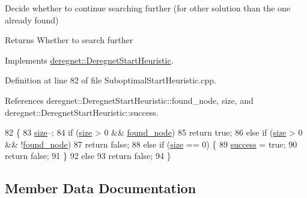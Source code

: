 Decide whether to continue searching further (for other solution than the one already found) 

\begin{DoxyReturn}{Returns}
Whether to search further 
\end{DoxyReturn}


Implements \hyperlink{classderegnet_1_1DeregnetStartHeuristic_ac3ee2c3022512f9d4ec7a6b49358e60a}{deregnet\+::\+Deregnet\+Start\+Heuristic}.



Definition at line 82 of file Suboptimal\+Start\+Heuristic.\+cpp.



References deregnet\+::\+Deregnet\+Start\+Heuristic\+::found\+\_\+node, size, and deregnet\+::\+Deregnet\+Start\+Heuristic\+::success.


\begin{DoxyCode}
82                                               \{
83     \hyperlink{classderegnet_1_1SuboptimalStartHeuristic_a8645bf64e5cd06e7c432eb7b38f3d80a}{size}--;
84     \textcolor{keywordflow}{if} (\hyperlink{classderegnet_1_1SuboptimalStartHeuristic_a8645bf64e5cd06e7c432eb7b38f3d80a}{size} > 0 && \hyperlink{classderegnet_1_1DeregnetStartHeuristic_a1ca705794583fb3b6e563efeceb4445e}{found\_node})
85         \textcolor{keywordflow}{return} \textcolor{keyword}{true};
86     \textcolor{keywordflow}{else} \textcolor{keywordflow}{if} (\hyperlink{classderegnet_1_1SuboptimalStartHeuristic_a8645bf64e5cd06e7c432eb7b38f3d80a}{size} > 0 && !\hyperlink{classderegnet_1_1DeregnetStartHeuristic_a1ca705794583fb3b6e563efeceb4445e}{found\_node})
87         \textcolor{keywordflow}{return} \textcolor{keyword}{false};
88     \textcolor{keywordflow}{else} \textcolor{keywordflow}{if} (\hyperlink{classderegnet_1_1SuboptimalStartHeuristic_a8645bf64e5cd06e7c432eb7b38f3d80a}{size} == 0) \{
89         \hyperlink{classderegnet_1_1DeregnetStartHeuristic_a72fd16ee027f6aa973f1ff29746addba}{success} = \textcolor{keyword}{true};
90         \textcolor{keywordflow}{return} \textcolor{keyword}{false};
91     \}
92     \textcolor{keywordflow}{else}
93         \textcolor{keywordflow}{return} \textcolor{keyword}{false};
94 \}
\end{DoxyCode}


\subsection{Member Data Documentation}
\mbox{\label{classderegnet_1_1SuboptimalStartHeuristic_a422ca9127a469117bab51ae3eb2fbdcf}} 
